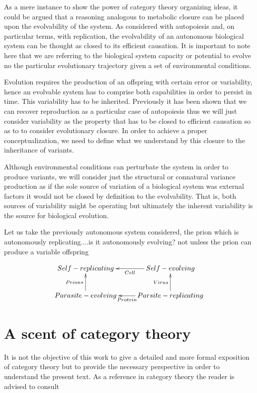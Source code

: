 \documentclass[aps,twocolumn]{revtex4-1}
\begin{document}
As a mere instance to show the power of category theory organizing ideas, it could be argued that a reasoning analogous to metabolic closure can be placed upon the evolvability of the system. As considered with autopoiesis and, on particular terms, with replication, the evolvability of an autonomous biological system can be thought as closed to its efficient causation. It is important to note here that we are referring to the biological system capacity or potential to evolve no the particular evolutionary trajectory given a set of environmental conditions. 

Evolution requires the production of an offspring with certain error or variability, hence an evolvable system has to comprise both capabilities in order to persist in time.  This variability has to be inherited. Previously it has been shown that we can recover reproduction as a particular case of autopoiesis thus we will just consider variability as the property that has to be closed to efficient causation so as to to consider evolutionary closure. In order to achieve a proper conceptualization, we need to define what we understand by this closure to the inheritance of variants. 


Although environmental conditions can perturbate the system in order to produce variants, we will consider just the structural or connatural variance production as if the sole source of variation of a biological system was external factors it would not be closed by definition to the  evolvability. That is, both sources of variability might be operating but ultimately the inherent variability is the source for biological evolution.

Let us take the previously autonomous system considered, the prion which is autonomously replicating....is it autonomously evolving? not unless the prion can produce a variable offspring 

$$ \xymatrix{
			 Self-replicating & Self-evolving \ar[l]^-{Cell}\\
			 Parasite-evolving \ar[u]^-{Prion*} & Parsite-replicating \ar[l]^-{Protein}\ar[u]^-{Virus} \\} $$
			  
\section{A scent of category theory}

It is not the objective of this work to give a detailed and more formal exposition of category theory but to provide the necessary perspective in order to understand the present text. As a reference in category theory the reader is advised to consult
\end{document}
